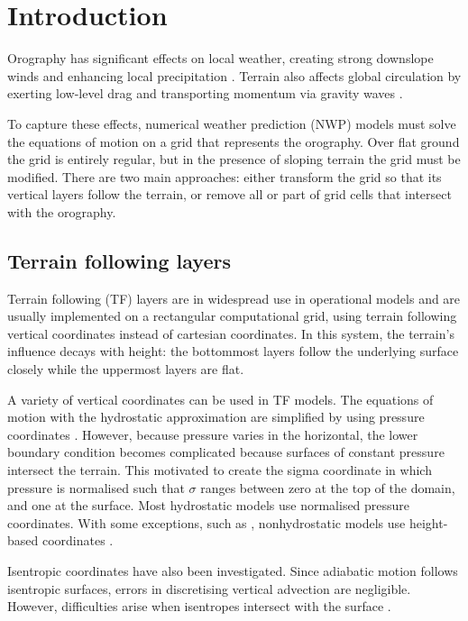 \chapter{Introduction}

Orography has significant effects on local weather, creating strong downslope winds and enhancing local precipitation \autocite{barry2008}.  Terrain also affects global circulation by exerting low-level drag \autocite{lott-miller1997} and transporting momentum via gravity waves \autocite{mcfarlane1987}.  

To capture these effects, numerical weather prediction (NWP) models must solve the equations of motion on a grid that represents the orography.
Over flat ground the grid is entirely regular, but in the presence of sloping terrain the grid must be modified.  There are two main approaches: either transform the grid so that its vertical layers follow the terrain, or remove all or part of grid cells that intersect with the orography.

\section{Terrain following layers}

Terrain following (TF) layers are in widespread use in operational models and are usually implemented on a rectangular computational grid, using terrain following vertical coordinates instead of cartesian coordinates.  In this system, the terrain's influence decays with height: the bottommost layers follow the underlying surface closely while the uppermost layers are flat.

A variety of vertical coordinates can be used in TF models.  The equations of motion with the hydrostatic approximation are simplified by using pressure coordinates \autocite{eliassen1949}.  However, because pressure varies in the horizontal, the lower boundary condition becomes complicated because surfaces of constant pressure intersect the terrain.  This motivated \textcite{phillips1957} to create the sigma coordinate in which pressure is normalised such that $\sigma$ ranges between zero at the top of the domain, and one at the surface.
Most hydrostatic models use normalised pressure coordinates.  With some exceptions, such as \textcite{xue-thorpe1991}, nonhydrostatic models use height-based coordinates \autocite{steppeler2003}.

Isentropic coordinates have also been investigated.  Since adiabatic motion follows isentropic surfaces, errors in discretising vertical advection are negligible.  However, difficulties arise when isentropes intersect with the surface \autocite{konor-arakawa1997}.

